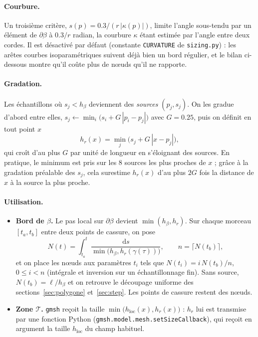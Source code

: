 \documentclass[11pt,a4paper]{article}
\begin{document}
\paragraph{Courbure.} Un troisième critère, $s(p) = 0.3 / (r\, |\kappa(p)|)$,
limite l'angle sous-tendu par un élément de $\partial\beta$ à $0.3 / r$ radian,
la courbure $\kappa$ étant estimée par l'angle entre deux cordes. Il est
désactivé par défaut (constante \texttt{CURVATURE} de \texttt{sizing.py}) :
les arêtes courbes isoparamétriques suivent déjà bien un bord régulier, et le
bilan ci-dessous montre qu'il coûte plus de nœuds qu'il ne rapporte.

\paragraph{Gradation.} Les échantillons où $s_j < h_\beta$ deviennent des
\emph{sources} $(p_j, s_j)$. On les gradue d'abord entre elles,
$s_j \leftarrow \min_i \big(s_i + G\,|p_i - p_j|\big)$ avec $G = 0.25$, puis
on définit en tout point $x$
\[
h_r(x) = \min_j \big( s_j + G\,|x - p_j| \big),
\]
qui croît d'au plus $G$ par unité de longueur en s'éloignant des sources. En
pratique, le minimum est pris sur les $8$ sources les plus proches de $x$ ;
grâce à la gradation préalable des $s_j$, cela surestime $h_r(x)$ d'au plus
$2G$ fois la distance de $x$ à la source la plus proche.

\paragraph{Utilisation.}
\begin{itemize}
  \item \textbf{Bord de $\beta$.} Le pas local sur $\partial\beta$ devient
        $\min(h_\beta, h_r)$. Sur chaque morceau $[t_a, t_b]$ entre deux points
        de cassure, on pose
        \[
        N(t) = \int_{t_a}^{t} \frac{\mathrm{d}s}{\min\big(h_\beta, h_r(\gamma(\tau))\big)},
        \qquad n = \big\lceil N(t_b) \big\rceil,
        \]
        et on place les nœuds aux paramètres $t_i$ tels que
        $N(t_i) = i\, N(t_b) / n$, $0 \le i < n$ (intégrale et inversion sur
        un échantillonnage fin). Sans source, $N(t_b) = \ell / h_\beta$ et on
        retrouve le découpage uniforme des sections~\ref{sec:polygone}
        et~\ref{sec:step}. Les points de cassure restent des nœuds.
  \item \textbf{Zone $\mathcal{T}$.} \texttt{gmsh} reçoit la taille
        $\min\big(h_{\mathrm{loc}}(x), h_r(x)\big)$ : $h_r$ lui est transmise
        par une fonction Python (\texttt{gmsh.model.mesh.setSizeCallback}),
        qui reçoit en argument la taille $h_{\mathrm{loc}}$ du champ habituel.
\end{itemize}
\end{document}
